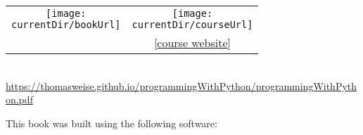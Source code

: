 %
\clearpage%
%
\strut\vfill\strut%
%
\begin{center}%
\begin{tabular}{c@{~~~~~~~~~~~~}c}%
\texttt{[image: \\currentDir/bookUrl]}&\texttt{[image: \\currentDir/courseUrl]}\\\relax%
[\href{https://thomasweise.github.io/programmingWithPython/programmingWithPython.pdf}{book pdf}]&[\href{https://thomasweise.github.io/programmingWithPython}{course website}]\\%
\end{tabular}\\[12pt]%
\url{https://thomasweise.github.io/programmingWithPython/programmingWithPython.pdf}%
\end{center}%
%
\strut\vfill\strut%
This book was built using the following software:%
%
